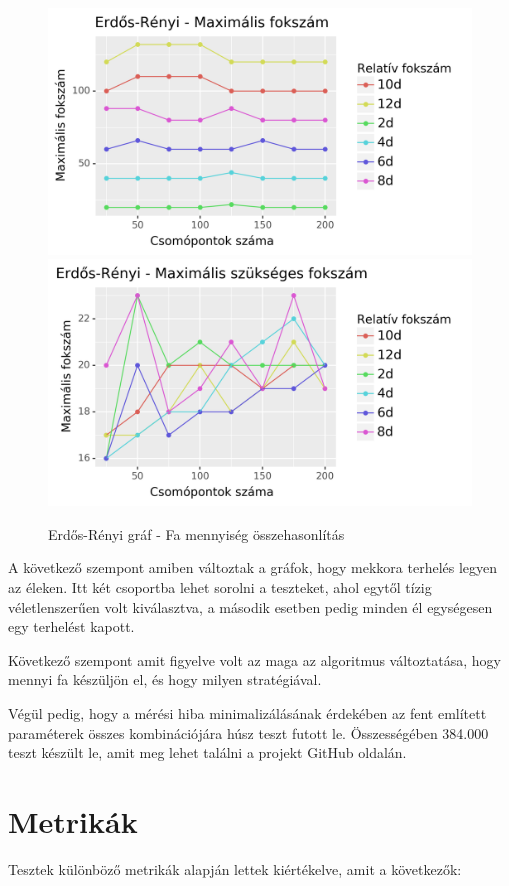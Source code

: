 \documentclass[12pt]{report}
\begin{document}
\begin{figure}[H]
	\begin{center}
		\includegraphics[width=0.49\linewidth]{pictures/delta_max.png}
		\includegraphics[width=0.49\linewidth]{pictures/delta_req.png}
		\caption{Erdős-Rényi gráf - Fa mennyiség összehasonlítás}
		\label{delta}
	\end{center}
\end{figure}

A következő szempont amiben változtak a gráfok, hogy mekkora terhelés legyen az éleken.
Itt két csoportba lehet sorolni a teszteket, ahol egytől tízig véletlenszerűen volt kiválasztva, a második esetben pedig minden él egységesen egy terhelést kapott.

Következő szempont amit figyelve volt az maga az algoritmus változtatása, hogy mennyi fa készüljön el, és hogy milyen stratégiával.

Végül pedig, hogy a mérési hiba minimalizálásának érdekében az fent említett paraméterek összes kombinációjára húsz teszt futott le. 
Összességében 384.000 teszt készült le, amit meg lehet találni a projekt GitHub oldalán.

\section{Metrikák}

Tesztek különböző metrikák alapján lettek kiértékelve, amit a következők:
\end{document}

